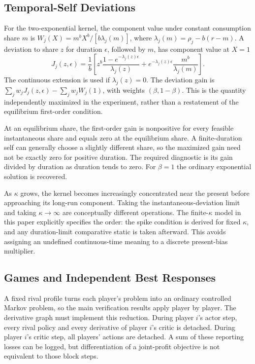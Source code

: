 \subsection{Temporal-Self Deviations}
For the two-exponential kernel, the component value under constant consumption share $m$ is $W_j(X)=m^bX^b/[b\lambda_j(m)]$, where $\lambda_j(m)=\rho_j-b(r-m)$. A deviation to share $z$ for duration $\epsilon$, followed by $m$, has component value at $X=1$
\[
 J_j(z,\epsilon)=\frac1b\left[
 z^b\frac{1-e^{-\lambda_j(z)\epsilon}}{\lambda_j(z)}
 +e^{-\lambda_j(z)\epsilon}\frac{m^b}{\lambda_j(m)}\right].
\]
The continuous extension is used if $\lambda_j(z)=0$. The deviation gain is $\sum_jw_jJ_j(z,\epsilon)-\sum_jw_jW_j(1)$, with weights $(\beta,1-\beta)$. This is the quantity independently maximized in the experiment, rather than a restatement of the equilibrium first-order condition.

At an equilibrium share, the first-order gain is nonpositive for every feasible instantaneous share and equals zero at the equilibrium share. A finite-duration self can generally choose a slightly different share, so the maximized gain need not be exactly zero for positive duration. The required diagnostic is its gain divided by duration as duration tends to zero. For $\beta=1$ the ordinary exponential solution is recovered.

As $\kappa$ grows, the kernel becomes increasingly concentrated near the present before approaching its long-run component. Taking the instantaneous-deviation limit and taking $\kappa\to\infty$ are conceptually different operations. The finite-$\kappa$ model in this paper explicitly specifies the order: the spike condition is derived for fixed $\kappa$, and any duration-limit comparative static is taken afterward. This avoids assigning an undefined continuous-time meaning to a discrete present-bias multiplier.

\subsection{Games and Independent Best Responses}
A fixed rival profile turns each player's problem into an ordinary controlled Markov problem, so the main verification results apply player by player. The derivative graph must implement this reduction. During player $i$'s actor step, every rival policy and every derivative of player $i$'s critic is detached. During player $i$'s critic step, all players' actions are detached. A sum of these reporting losses can be logged, but differentiation of a joint-profit objective is not equivalent to those block steps.

